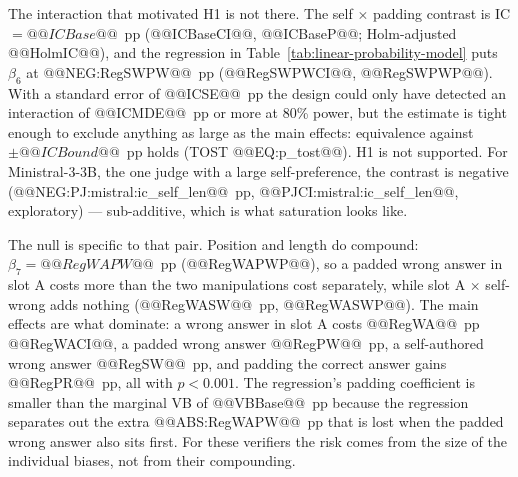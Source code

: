 \documentclass[conference]{IEEEtran}
\begin{document}
The interaction that motivated H1 is not there. The self $\times$ padding contrast is IC $=@@ICBase@@$~pp (@@ICBaseCI@@, @@ICBaseP@@; Holm-adjusted @@HolmIC@@), and the regression in Table~\ref{tab:linear-probability-model} puts $\beta_6$ at @@NEG:RegSWPW@@~pp (@@RegSWPWCI@@, @@RegSWPWP@@). With a standard error of @@ICSE@@~pp the design could only have detected an interaction of @@ICMDE@@~pp or more at 80\% power, but the estimate is tight enough to exclude anything as large as the main effects: equivalence against $\pm@@ICBound@@$~pp holds (TOST @@EQ:p_tost@@). H1 is not supported. For Ministral-3-3B, the one judge with a large self-preference, the contrast is negative (@@NEG:PJ:mistral:ic_self_len@@~pp, @@PJCI:mistral:ic_self_len@@, exploratory) --- sub-additive, which is what saturation looks like.

The null is specific to that pair. Position and length do compound: $\beta_7=@@RegWAPW@@$~pp (@@RegWAPWP@@), so a padded wrong answer in slot A costs more than the two manipulations cost separately, while slot A $\times$ self-wrong adds nothing (@@RegWASW@@~pp, @@RegWASWP@@). The main effects are what dominate: a wrong answer in slot A costs @@RegWA@@~pp @@RegWACI@@, a padded wrong answer @@RegPW@@~pp, a self-authored wrong answer @@RegSW@@~pp, and padding the correct answer gains @@RegPR@@~pp, all with $p<0.001$. The regression's padding coefficient is smaller than the marginal VB of @@VBBase@@~pp because the regression separates out the extra @@ABS:RegWAPW@@~pp that is lost when the padded wrong answer also sits first. For these verifiers the risk comes from the size of the individual biases, not from their compounding.
\end{document}
